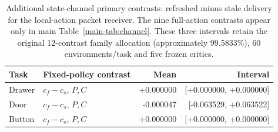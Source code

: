 \begin{table}[H]\centering\small
\caption{Additional state-channel primary contrasts: refreshed minus stale delivery for the local-action packet receiver. The nine full-action contrasts appear only in main Table~\ref{main-tab:channel}. These three intervals retain the original 12-contrast family allocation (approximately 99.5833\%), 60 environments/task and five frozen critics.}\label{s-tab:channel}
\begin{tabular}{llrr}\toprule Task & Fixed-policy contrast & Mean & Interval\\\midrule
Drawer & $c_f-c_s$, $P,C$ & +0.000000 & [+0.000000, +0.000000]\\
Door & $c_f-c_s$, $P,C$ & -0.000047 & [-0.063529, +0.063522]\\
Button & $c_f-c_s$, $P,C$ & +0.000000 & [+0.000000, +0.000000]\\
\bottomrule\end{tabular}\end{table}
